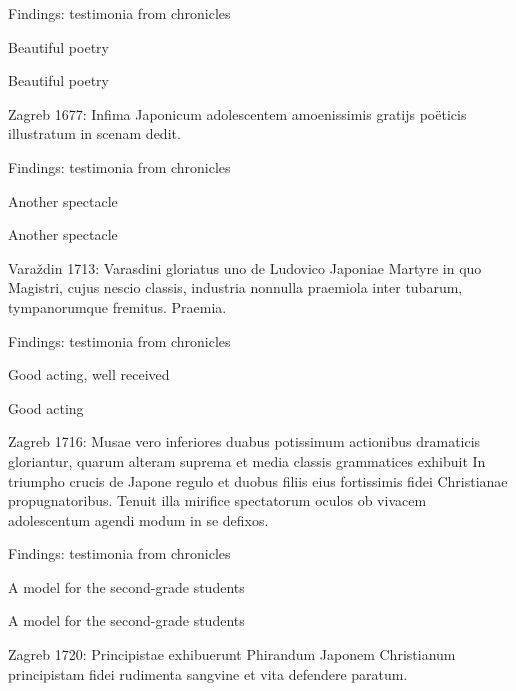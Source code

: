 \documentclass[14pt]{beamer}
\begin{document}
\begin{frame}{Findings: testimonia from chronicles}

Beautiful poetry


\end{frame}

\begin{frame}{Beautiful poetry}

\alert{Zagreb 1677}: Infima Japonicum adolescentem amoenissimis gratijs poëticis illustratum in scenam dedit.

\end{frame}

\begin{frame}{Findings: testimonia from chronicles}

Another spectacle


\end{frame}

\begin{frame}{Another spectacle}

\alert{Varaždin 1713}: Varasdini gloriatus uno de Ludovico Japoniae Martyre in quo Magistri, cujus nescio classis, industria nonnulla praemiola inter tubarum, tympanorumque fremitus. Praemia.

\end{frame}

\begin{frame}{Findings: testimonia from chronicles}

Good acting, well received


\end{frame}

\begin{frame}{Good acting}

\alert{Zagreb 1716}: Musae vero inferiores duabus potissimum actionibus dramaticis gloriantur, quarum alteram suprema et media classis grammatices exhibuit In triumpho crucis de Japone regulo et duobus filiis eius fortissimis fidei Christianae propugnatoribus. Tenuit illa mirifice spectatorum oculos ob vivacem adolescentum agendi modum in se defixos.

\end{frame}

\begin{frame}{Findings: testimonia from chronicles}

A model for the second-grade students

\end{frame}

\begin{frame}{A model for the second-grade students}

\alert{Zagreb 1720}: Principistae exhibuerunt Phirandum Japonem Christianum principistam fidei rudimenta sangvine et vita defendere paratum.

\end{frame}
\end{document}

